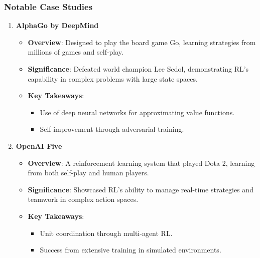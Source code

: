\documentclass[aspectratio=169]{beamer}
\begin{document}
\begin{frame}[fragile]
    \frametitle{Notable Case Studies}
    \begin{enumerate}
        \item \textbf{AlphaGo by DeepMind}
        \begin{itemize}
            \item \textbf{Overview}: Designed to play the board game Go, learning strategies from millions of games and self-play.
            \item \textbf{Significance}: Defeated world champion Lee Sedol, demonstrating RL's capability in complex problems with large state spaces.
            \item \textbf{Key Takeaways}:
            \begin{itemize}
                \item Use of deep neural networks for approximating value functions.
                \item Self-improvement through adversarial training.
            \end{itemize}
        \end{itemize}

        \item \textbf{OpenAI Five}
        \begin{itemize}
            \item \textbf{Overview}: A reinforcement learning system that played Dota 2, learning from both self-play and human players.
            \item \textbf{Significance}: Showcased RL's ability to manage real-time strategies and teamwork in complex action spaces.
            \item \textbf{Key Takeaways}:
            \begin{itemize}
                \item Unit coordination through multi-agent RL.
                \item Success from extensive training in simulated environments.
            \end{itemize}
        \end{itemize}
    \end{enumerate}
\end{frame}
\end{document}
